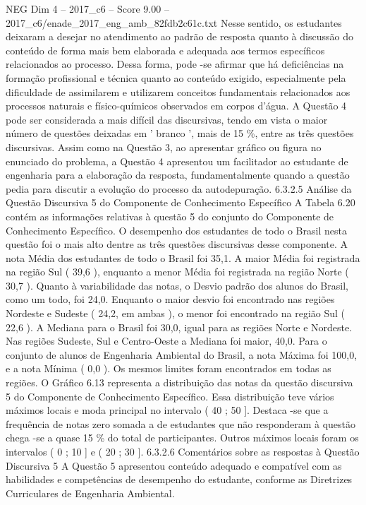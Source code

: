 \begin{textsample}{NEG Dim 4 – 2017\_c6 – Score 9.00 – 2017\_c6/enade\_2017\_eng\_amb\_82fdb2c61c.txt}
Nesse sentido, os estudantes deixaram a desejar no atendimento ao padrão de resposta quanto à discussão do conteúdo de forma mais bem elaborada e adequada aos termos específicos relacionados ao processo.
Dessa forma, pode -se afirmar que há deficiências na formação profissional e técnica quanto ao conteúdo exigido, especialmente pela dificuldade de assimilarem e utilizarem conceitos fundamentais relacionados aos processos naturais e físico-químicos observados em corpos d'água.
A Questão 4 pode ser considerada a mais difícil das discursivas, tendo em vista o maior número de questões deixadas em ' branco ', mais de 15 \%, entre as três questões discursivas.
Assim como na Questão 3, ao apresentar gráfico ou figura no enunciado do problema, a Questão 4 apresentou um facilitador ao estudante de engenharia para a elaboração da resposta, fundamentalmente quando a questão pedia para discutir a evolução do processo da autodepuração. 6.3.2.5 Análise da Questão Discursiva 5 do Componente de Conhecimento Específico A Tabela 6.20 contém as informações relativas à questão 5 do conjunto do Componente de Conhecimento Específico.
O desempenho dos estudantes de todo o Brasil nesta questão foi o mais alto dentre as três questões discursivas desse componente.
A nota Média dos estudantes de todo o Brasil foi 35,1.
A maior Média foi registrada na região Sul ( 39,6 ), enquanto a menor Média foi registrada na região Norte ( 30,7 ).
Quanto à variabilidade das notas, o Desvio padrão dos alunos do Brasil, como um todo, foi 24,0.
Enquanto o maior desvio foi encontrado nas regiões Nordeste e Sudeste ( 24,2, em ambas ), o menor foi encontrado na região Sul ( 22,6 ).
A Mediana para o Brasil foi 30,0, igual para as regiões Norte e Nordeste.
Nas regiões Sudeste, Sul e Centro-Oeste a Mediana foi maior, 40,0.
Para o conjunto de alunos de Engenharia Ambiental do Brasil, a nota Máxima foi 100,0, e a nota Mínima ( 0,0 ).
Os mesmos limites foram encontrados em todas as regiões.
O Gráfico 6.13 representa a distribuição das notas da questão discursiva 5 do Componente de Conhecimento Específico.
Essa distribuição teve vários máximos locais e moda principal no intervalo ( 40 ; 50 ].
Destaca -se que a frequência de notas zero somada a de estudantes que não responderam à questão chega -se a quase 15 \% do total de participantes.
Outros máximos locais foram os intervalos ( 0 ; 10 ] e ( 20 ; 30 ]. 6.3.2.6 Comentários sobre as respostas à Questão Discursiva 5 A Questão 5 apresentou conteúdo adequado e compatível com as habilidades e competências de desempenho do estudante, conforme as Diretrizes Curriculares de Engenharia Ambiental.

\end{textsample}
